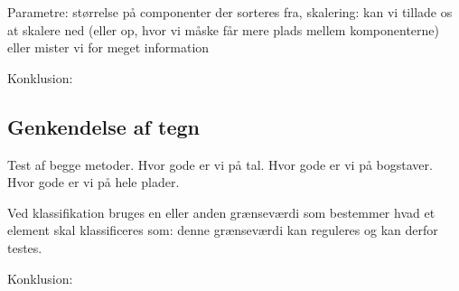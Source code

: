 Parametre: størrelse på componenter der sorteres fra, skalering: kan vi tillade os at skalere ned (eller op, hvor vi måske får mere plads mellem komponenterne) eller mister vi for meget information



Konklusion:

\subsection{Genkendelse af tegn}
Test af begge metoder.
Hvor gode er vi på tal. Hvor gode er vi på bogstaver. Hvor gode er vi på hele plader.

Ved klassifikation bruges en eller anden grænseværdi som bestemmer hvad et element skal klassificeres som: denne grænseværdi kan reguleres og kan derfor testes.

Konklusion:
